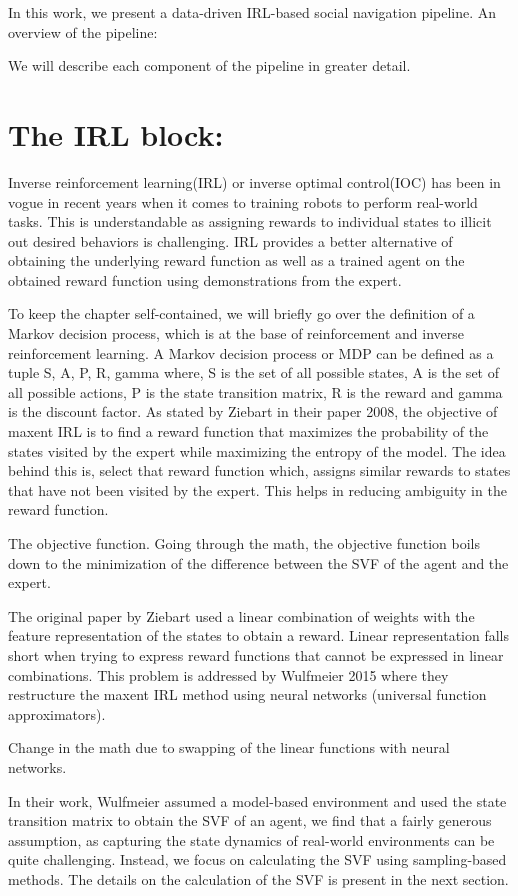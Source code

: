 In this work, we present a data-driven IRL-based social navigation pipeline. An overview of the pipeline:


We will describe each component of the pipeline in greater detail.
\section*{The IRL block:}
Inverse reinforcement learning(IRL) or inverse optimal control(IOC) has been in vogue in recent years when it comes to training robots to perform real-world tasks. This is understandable as assigning rewards to individual states to illicit out desired behaviors is challenging. IRL provides a better alternative of obtaining the underlying reward function as well as a trained agent on the obtained reward function using demonstrations from the expert.

To keep the chapter self-contained, we will briefly go over the definition of a Markov decision process, which is at the base of reinforcement and inverse reinforcement learning.
A Markov decision process or MDP can be defined as a tuple {S, A, P, R, gamma} where,
S is the set of all possible states,
A is the set of all possible actions,
P is the state transition matrix,
R is the reward and gamma is the discount factor.
As stated by Ziebart in their paper 2008, the objective of maxent IRL is to find a reward function that maximizes the probability of the states visited by the expert while maximizing the entropy of the model. The idea behind this is, select that reward function which, assigns similar rewards to states that have not been visited by the expert. This helps in reducing ambiguity in the reward function.

The objective function.
Going through the math, the objective function boils down to the minimization of the difference between the SVF of the agent and the expert.

The original paper by Ziebart used a linear combination of weights with the feature representation of the states to obtain a reward. Linear representation falls short when trying to express reward functions that cannot be expressed in linear combinations. This problem is addressed by Wulfmeier 2015 where they restructure the maxent IRL method using neural networks (universal function approximators).

Change in the math due to swapping of the linear functions with neural networks.


In their work, Wulfmeier assumed a model-based environment and used the state transition matrix to obtain the SVF of an agent, we find that a fairly generous assumption, as capturing the state dynamics of real-world environments can be quite challenging. Instead, we focus on calculating the SVF using sampling-based methods. The details on the calculation of the SVF is present in the next section. 

